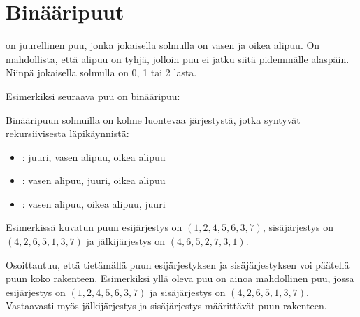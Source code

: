 \section{Binääripuut}


\begin{samepage}
 on juurellinen puu,
jonka jokaisella solmulla on vasen ja oikea alipuu.
On mahdollista, että alipuu on tyhjä,
jolloin puu ei jatku siitä pidemmälle alaspäin.
Niinpä jokaisella solmulla on 0, 1 tai 2 lasta.

Esimerkiksi seuraava puu on binääripuu:

\begin{center}
\end{center}
\end{samepage}

Binääripuun solmuilla on kolme luontevaa järjestystä,
jotka syntyvät rekursiivisesta läpikäynnistä:


\begin{itemize}
\item {}: juuri, vasen alipuu, oikea alipuu
\item {}: vasen alipuu, juuri, oikea alipuu
\item {}: vasen alipuu, oikea alipuu, juuri
\end{itemize}

Esimerkissä kuvatun puun esijärjestys on
$(1,2,4,5,6,3,7)$,
sisäjärjestys on $(4,2,6,5,1,3,7)$
ja jälkijärjestys on $(4,6,5,2,7,3,1)$.

Osoittautuu, että tietämällä puun esijärjestyksen
ja sisäjärjestyksen voi päätellä puun koko rakenteen.
Esimerkiksi yllä oleva puu on ainoa mahdollinen
puu, jossa esijärjestys on
$(1,2,4,5,6,3,7)$ ja sisäjärjestys on $(4,2,6,5,1,3,7)$.
Vastaavasti myös jälkijärjestys ja sisäjärjestys
määrittävät puun rakenteen.

